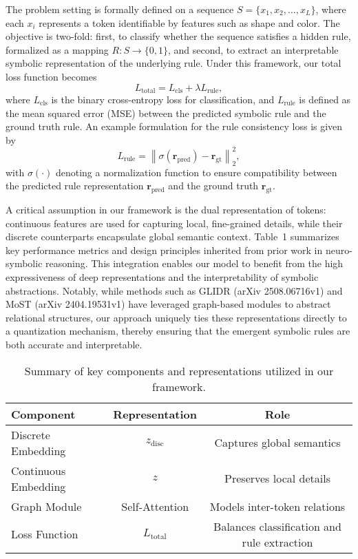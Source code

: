 \documentclass{article}
\begin{document}
The problem setting is formally defined on a sequence \( S = \{ x_1, x_2, \dots, x_L \} \), where each \( x_i \) represents a token identifiable by features such as shape and color. The objective is two-fold: first, to classify whether the sequence satisfies a hidden rule, formalized as a mapping \( R: S \rightarrow \{0,1\} \), and second, to extract an interpretable symbolic representation of the underlying rule. Under this framework, our total loss function becomes
\[
L_{\text{total}} = L_{\text{cls}} + \lambda L_{\text{rule}},
\]
where \( L_{\text{cls}} \) is the binary cross-entropy loss for classification, and \( L_{\text{rule}} \) is defined as the mean squared error (MSE) between the predicted symbolic rule and the ground truth rule. An example formulation for the rule consistency loss is given by
\[
L_{\text{rule}} = \left\| \sigma(\mathbf{r}_{\text{pred}}) - \mathbf{r}_{\text{gt}} \right\|_2^2,
\]
with \(\sigma(\cdot)\) denoting a normalization function to ensure compatibility between the predicted rule representation \(\mathbf{r}_{\text{pred}}\) and the ground truth \(\mathbf{r}_{\text{gt}}\).

A critical assumption in our framework is the dual representation of tokens: continuous features are used for capturing local, fine-grained details, while their discrete counterparts encapsulate global semantic context. Table~1 summarizes key performance metrics and design principles inherited from prior work in neuro-symbolic reasoning. This integration enables our model to benefit from the high expressiveness of deep representations and the interpretability of symbolic abstractions. Notably, while methods such as GLIDR (arXiv 2508.06716v1) and MoST (arXiv 2404.19531v1) have leveraged graph-based modules to abstract relational structures, our approach uniquely ties these representations directly to a quantization mechanism, thereby ensuring that the emergent symbolic rules are both accurate and interpretable.

\begin{table}[h]
\centering
\begin{tabular}{|l|c|c|}
\hline
\textbf{Component} & \textbf{Representation} & \textbf{Role} \\
\hline
Discrete Embedding & \( z_{\text{disc}} \) & Captures global semantics \\
Continuous Embedding & \( z \) & Preserves local details \\
Graph Module & Self-Attention & Models inter-token relations \\
Loss Function & \( L_{\text{total}} \) & Balances classification and rule extraction \\
\hline
\end{tabular}
\caption{Summary of key components and representations utilized in our framework.}
\end{table}
\end{document}

